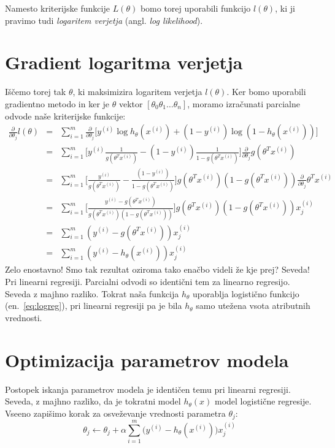 Namesto kriterijske funkcije $L(\theta)$ bomo torej uporabili funkcijo $l(\theta)$, ki ji pravimo tudi {\em logaritem verjetja} (angl. {\em log likelihood}).

\section{Gradient logaritma verjetja}

Iščemo torej tak $\theta$, ki maksimizira logaritem verjetja $l(\theta)$. Ker bomo uporabili gradientno metodo in ker je $\theta$ vektor $[\theta_0 \theta_1 \ldots \theta_n]$, moramo izračunati parcialne odvode naše kriterijske funkcije:
\begin{eqnarray}
  \frac{\partial}{\partial\theta_j}l(\theta)
  & = & \sum_{i=1}^m \frac{\partial}{\partial\theta_j} \big[y^{(i)}\log h_\theta(x^{(i)})+(1-y^{(i)})\log (1-h_\theta(x^{(i)})) \big] \nonumber \\
  & = & \sum_{i=1}^m \big[y^{(i)}\frac{1}{g(\theta^T x^{(i)})}-(1-y^{(i)})\frac{1}{1-g(\theta^T x^{(i)})} \big]\frac{\partial}{\partial\theta_j}g(\theta^T x^{(i)}) \nonumber\\
  & = & \sum_{i=1}^m \big[\frac{y^{(i)}}{g(\theta^T x^{(i)})}-\frac{(1-y^{(i)})}{1-g(\theta^T x^{(i)})} \big]g(\theta^T x^{(i)})(1-g(\theta^T x^{(i)}))
  \frac{\partial}{\partial\theta_j}\theta^T x^{(i)}\nonumber\\
  & = & \sum_{i=1}^m \big[\frac{y^{(i)} - g(\theta^T x^{(i)})} {g(\theta^T x^{(i)})(1-g(\theta^T x^{(i)}))} \big]g(\theta^T x^{(i)})(1-g(\theta^T x^{(i)})) x_j^{(i)}\nonumber\\
  & = & \sum_{i=1}^m (y^{(i)}-g(\theta^T x^{(i)}))x_j^{(i)}\nonumber\\
  & = & \sum_{i=1}^m (y^{(i)}-h_\theta(x^{(i)}))x_j^{(i)}\nonumber
  \label{eq:logreg-grad}
\end{eqnarray}
Zelo enostavno! Smo tak rezultat oziroma tako enačbo videli že kje prej? Seveda! Pri linearni regresiji. Parcialni odvodi so identični tem za linearno regresijo. Seveda z majhno razliko. Tokrat naša funkcija $h_\theta$ uporablja logistično funkcijo (en.~\ref{eq:logreg}), pri linearni regresiji pa je bila $h_\theta$ samo utežena vsota atributnih vrednosti.

\section{Optimizacija parametrov modela}

Postopek iskanja parametrov modela je identičen temu pri linearni regresiji. Seveda, z majhno razliko, da je tokratni model $h_\theta(x)$ model logistične regresije. Vseeno zapišimo korak za osveževanje vrednosti parametra $\theta_j$:
\begin{equation}
  \theta_j\leftarrow\theta_j+\alpha\sum_{i=1}^{m}\big(y^{(i)}-h_\theta(x^{(i)})\big) x_j^{(i)}
\end{equation}

